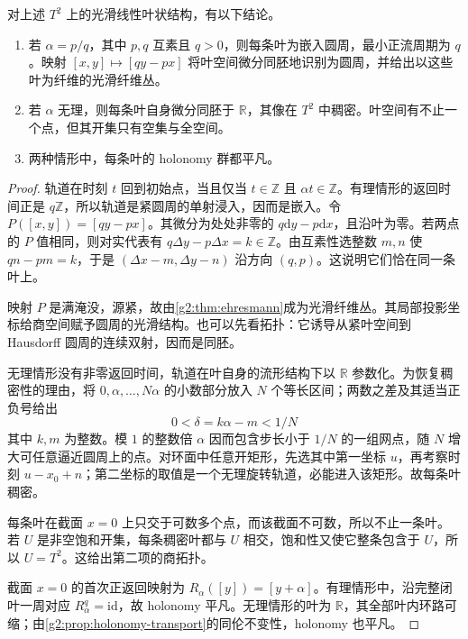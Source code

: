 \begin{proposition}\label{g2:prop:torus-foliation-quotient}
	对上述 \(T^2\) 上的光滑线性叶状结构，有以下结论。
	\begin{enumerate}
		\item 若 \(\alpha=p/q\)，其中 \(p,q\) 互素且 \(q>0\)，则每条叶为嵌入圆周，最小正流周期为 \(q\)。映射 \([x,y]\mapsto[qy-px]\) 将叶空间微分同胚地识别为圆周，并给出以这些叶为纤维的光滑纤维丛。
		\item 若 \(\alpha\) 无理，则每条叶自身微分同胚于 \(\mathbb R\)，其像在 \(T^2\) 中稠密。叶空间有不止一个点，但其开集只有空集与全空间。
		\item 两种情形中，每条叶的 holonomy 群都平凡。
	\end{enumerate}
\end{proposition}
\begin{proof}
	轨道在时刻 \(t\) 回到初始点，当且仅当 \(t\in\mathbb Z\) 且 \(\alpha t\in\mathbb Z\)。有理情形的返回时间正是 \(q\mathbb Z\)，所以轨道是紧圆周的单射浸入，因而是嵌入。令 \(P([x,y])=[qy-px]\)。其微分为处处非零的 \(q\mathrm dy-p\mathrm dx\)，且沿叶为零。若两点的 \(P\) 值相同，则对实代表有 \(q\Delta y-p\Delta x=k\in\mathbb Z\)。由互素性选整数 \(m,n\) 使 \(qn-pm=k\)，于是 \((\Delta x-m,\Delta y-n)\) 沿方向 \((q,p)\)。这说明它们恰在同一条叶上。

	映射 \(P\) 是满淹没，源紧，故由\cref{g2:thm:ehresmann}成为光滑纤维丛。其局部投影坐标给商空间赋予圆周的光滑结构。也可以先看拓扑：它诱导从紧叶空间到 Hausdorff 圆周的连续双射，因而是同胚。

	无理情形没有非零返回时间，轨道在叶自身的流形结构下以 \(\mathbb R\) 参数化。为恢复稠密性的理由，将 \(0,\alpha,\ldots,N\alpha\) 的小数部分放入 \(N\) 个等长区间；两数之差及其适当正负号给出
	\[
		0<\delta=k\alpha-m<1/N
	\]
	其中 \(k,m\) 为整数。模 \(1\) 的整数倍 \(\alpha\) 因而包含步长小于 \(1/N\) 的一组网点，随 \(N\) 增大可任意逼近圆周上的点。对环面中任意开矩形，先选其中第一坐标 \(u\)，再考察时刻 \(u-x_0+n\)；第二坐标的取值是一个无理旋转轨道，必能进入该矩形。故每条叶稠密。

	每条叶在截面 \(x=0\) 上只交于可数多个点，而该截面不可数，所以不止一条叶。若 \(U\) 是非空饱和开集，每条稠密叶都与 \(U\) 相交，饱和性又使它整条包含于 \(U\)，所以 \(U=T^2\)。这给出第二项的商拓扑。

	截面 \(x=0\) 的首次正返回映射为 \(R_\alpha([y])=[y+\alpha]\)。有理情形中，沿完整闭叶一周对应 \(R_\alpha^q=\mathrm{id}\)，故 holonomy 平凡。无理情形的叶为 \(\mathbb R\)，其全部叶内环路可缩；由\cref{g2:prop:holonomy-transport}的同伦不变性，holonomy 也平凡。
\end{proof}

